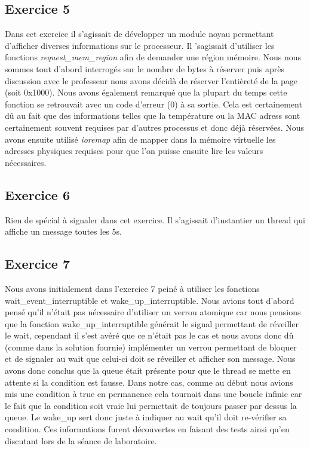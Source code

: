 \documentclass{ReportTemplate}
\begin{document}
\subsection{Exercice 5}
Dans cet exercice il s'agissait de développer un module noyau permettant
d'afficher diverses informations sur le processeur. Il 'sagissait d'utiliser les
fonctions \textit{request\_mem\_region} afin de demander une région mémoire.
Nous nous sommes tout d'abord interrogés sur le nombre de bytes à réserver puis
après discussion avec le professeur nous avons décidà de réserver l'entièreté de
la page (soit 0x1000). Nous avons également remarqué que la plupart du temps
cette fonction se retrouvait avec un code d'erreur (0) à sa sortie. Cela est
certainement dû au fait que des informations telles que la température ou la MAC
adress sont certainement souvent requises par d'autres processus et donc déjà
réservées. Nous avons ensuite utilisé \textit{ioremap} afin de mapper dans la
mémoire virtuelle les adresses physiques requises pour que l'on puisse ensuite
lire les valeurs nécessaires.
\subsection{Exercice 6}
Rien de spécial à signaler dans cet exercice. Il s'agissait d'instantier un
thread qui affiche un message toutes les 5s.
\subsection{Exercice 7}
Nous avons initialement dans l'exercice 7 peiné à utiliser les fonctions
wait\_event\_interruptible et wake\_up\_interruptible. Nous avions tout d'abord
pensé qu'il n'était pas nécessaire d'utiliser un verrou atomique car nous
pensions que la fonction wake\_up\_interruptible générait le signal permettant
de réveiller le wait, cependant il s'est avéré que ce n'était pas le cas et nous
avons donc dû (comme dans la solution fournie) implémenter un verrou permettant
de bloquer et de signaler au wait que celui-ci doit se réveiller et afficher son
message. Nous avons donc conclus que la queue était présente pour que le thread
se mette en attente si la condition est fausse. Dans notre cas, comme au début
nous avions mis une condition à true en permanence cela tournait dans une boucle
infinie car le fait que la condition soit vraie lui permettait de toujours
passer par dessus la queue. Le wake\_up sert donc juste à indiquer au wait qu'il
doit re-vérifier sa condition. Ces informations furent découvertes en faisant
des tests ainsi qu'en discutant lors de la séance de laboratoire.\newline
\end{document}
